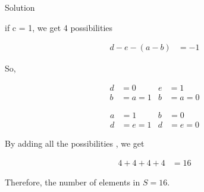 \documentclass{beamer}
\numberwithin{equation}{section}
\theoremstyle{remark}
\begin{document}
\begin{frame}{Solution}

if c = 1, we get 4 possibilities

\begin{align}
d - e -(a - b) &= -1
\end{align}

So,

\begin{align}
  d &= 0 & e&=1 \\   
  b&=a=1 & b&=a=0
\end{align}

\begin{align}
  a &= 1 & b&=0 \\   
  d&=e=1 & d&=e=0
\end{align}

By adding all the possibilities , we get 

\begin{align}
  4 + 4 + 4 + 4 &= 16
\end{align}

Therefore, the number of elements in \(S=16\).

\end{frame}
\end{document}
